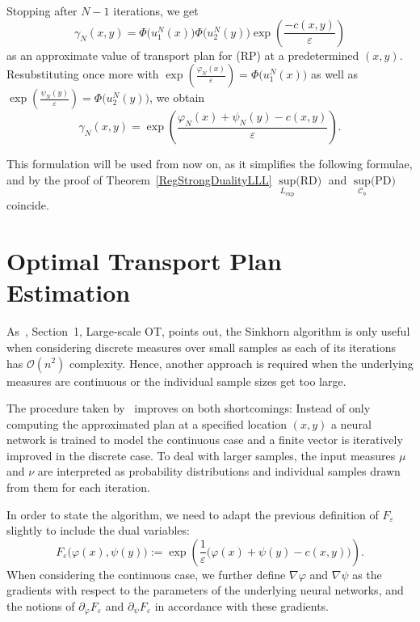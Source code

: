 Stopping after $N - 1$ iterations, we get
\[ \gamma_N(x, y) = \Phi\big( u_1^N(x) \big) \Phi\big( u_2^N(y) \big) \exp\left( \frac{- c(x, y)}{\varepsilon} \right) \]
as an approximate value of transport plan for (RP) at a predetermined $(x, y)$. Resubstituting once more with $\exp\left( \frac{\varphi_N(x)}{\varepsilon} \right) = \Phi\big( u_1^N(x) \big)$ as well as $\exp\left( \frac{\psi_N(y)}{\varepsilon} \right) = \Phi\big( u_2^N(y) \big)$, we obtain
\begin{equation}\label{RegApprTransPlan}
	\gamma_N(x, y) = \exp\left( \frac{\varphi_N(x) + \psi_N(y) - c(x, y)}{\varepsilon} \right).
\end{equation}

This formulation will be used from now on, as it simplifies the following formulae, and by the proof of Theorem~\ref{RegStrongDualityLLL} $\sup\limits_{L_{\exp}} \text{(RD)}$ and $\sup\limits_{\mathcal{C}_b} \text{(PD)}$ coincide.

\section{Optimal Transport Plan Estimation}\label{OTPlanEst}

As~\cite{Seg2018}, Section~1, Large-scale OT, points out, the Sinkhorn algorithm is only useful when considering discrete measures over small samples as each of its iterations has $\mathcal{O}(n^2)$ complexity. Hence, another approach is required when the underlying measures are continuous or the individual sample sizes get too large.

The procedure taken by~\cite{Seg2018} improves on both shortcomings: Instead of only computing the approximated plan at a specified location $(x, y)$ a neural network is trained to model the continuous case and a finite vector is iteratively improved in the discrete case. To deal with larger samples, the input measures $\mu$ and $\nu$ are interpreted as probability distributions and individual samples drawn from them for each iteration.

In order to state the algorithm, we need to adapt the previous definition of $F_\varepsilon$ slightly to include the dual variables:
\[ F_\varepsilon\big( \varphi(x), \psi(y) \big) := \exp\left( \frac{1}{\varepsilon} \big( \varphi(x) + \psi(y) - c(x, y) \big) \right). \]
When considering the continuous case, we further define $\nabla \varphi$ and $\nabla \psi$ as the gradients with respect to the parameters of the underlying neural networks, and the notions of $\partial_\varphi F_\varepsilon$ and $\partial_\psi F_\varepsilon$ in accordance with these gradients.


